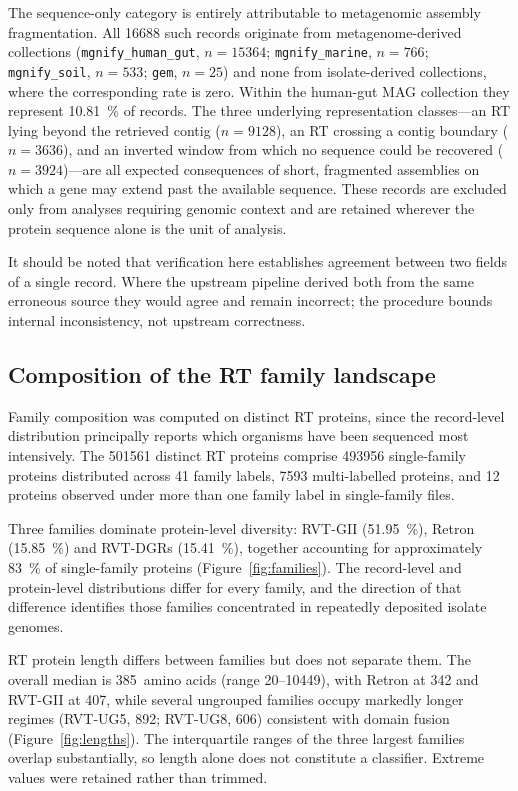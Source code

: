 The sequence-only category is entirely attributable to metagenomic assembly fragmentation. All
\num{16688} such records originate from metagenome-derived collections
(\texttt{mgnify\_human\_gut}, $n=\num{15364}$; \texttt{mgnify\_marine}, $n=766$;
\texttt{mgnify\_soil}, $n=533$; \texttt{gem}, $n=25$) and none from isolate-derived collections,
where the corresponding rate is zero. Within the human-gut MAG collection they represent
\SI{10.81}{\percent} of records. The three underlying representation classes---an RT lying beyond
the retrieved contig ($n=\num{9128}$), an RT crossing a contig boundary ($n=\num{3636}$), and an
inverted window from which no sequence could be recovered ($n=\num{3924}$)---are all expected
consequences of short, fragmented assemblies on which a gene may extend past the available sequence.
These records are excluded only from analyses requiring genomic context and are retained wherever
the protein sequence alone is the unit of analysis.

It should be noted that verification here establishes agreement between two fields of a single
record. Where the upstream pipeline derived both from the same erroneous source they would agree and
remain incorrect; the procedure bounds internal inconsistency, not upstream correctness.

\subsection{Composition of the RT family landscape}
\label{sec:dbchar:families}

Family composition was computed on distinct RT proteins, since the record-level distribution
principally reports which organisms have been sequenced most intensively. The \num{501561} distinct
RT proteins comprise \num{493956} single-family proteins distributed across 41 family labels,
\num{7593} multi-labelled proteins, and 12 proteins observed under more than one family label in
single-family files.

Three families dominate protein-level diversity: RVT-GII (\SI{51.95}{\percent}), Retron
(\SI{15.85}{\percent}) and RVT-DGRs (\SI{15.41}{\percent}), together accounting for approximately
\SI{83}{\percent} of single-family proteins (Figure~\ref{fig:families}). The record-level and
protein-level distributions differ for every family, and the direction of that difference identifies
those families concentrated in repeatedly deposited isolate genomes.

RT protein length differs between families but does not separate them. The overall median is
385~amino acids (range 20--\num{10449}), with Retron at 342 and RVT-GII at 407, while several
ungrouped families occupy markedly longer regimes (RVT-UG5, 892; RVT-UG8, 606) consistent with
domain fusion (Figure~\ref{fig:lengths}). The interquartile ranges of the three largest families
overlap substantially, so length alone does not constitute a classifier. Extreme values were
retained rather than trimmed.

